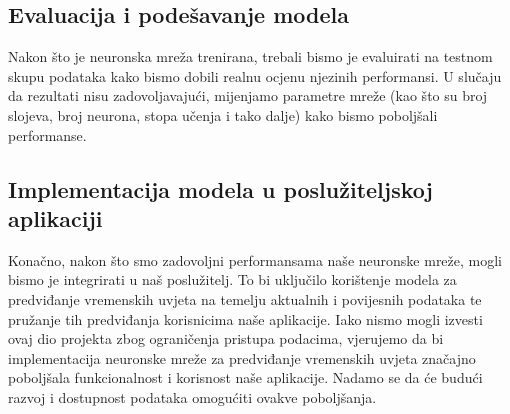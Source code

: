 \documentclass[times, utf8, zavrsni]{fer}
\begin{document}
\subsection{Evaluacija i podešavanje modela}
Nakon što je neuronska mreža trenirana, trebali bismo je evaluirati na testnom skupu podataka kako bismo dobili realnu ocjenu njezinih performansi. U slučaju da rezultati nisu zadovoljavajući, mijenjamo parametre mreže (kao što su broj slojeva, broj neurona, stopa učenja i tako dalje) kako bismo poboljšali performanse.

\subsection{Implementacija modela u poslužiteljskoj aplikaciji}
Konačno, nakon što smo zadovoljni performansama naše neuronske mreže, mogli bismo je integrirati u naš poslužitelj. To bi uključilo korištenje modela za predviđanje vremenskih uvjeta na temelju aktualnih i povijesnih podataka te pružanje tih predviđanja korisnicima naše aplikacije. Iako nismo mogli izvesti ovaj dio projekta zbog ograničenja pristupa podacima, vjerujemo da bi implementacija neuronske mreže za predviđanje vremenskih uvjeta značajno poboljšala funkcionalnost i korisnost naše aplikacije. Nadamo se da će budući razvoj i dostupnost podataka omogućiti ovakve poboljšanja.
\end{document}
